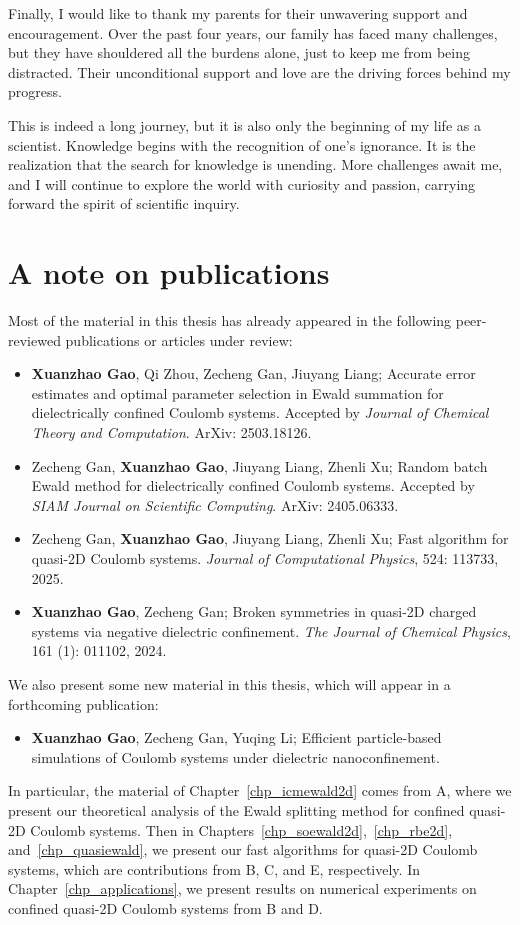 Finally, I would like to thank my parents for their unwavering support and encouragement.
Over the past four years, our family has faced many challenges, but they have shouldered all the burdens alone, just to keep me from being distracted.
Their unconditional support and love are the driving forces behind my progress.

This is indeed a long journey, but it is also only the beginning of my life as a scientist.
Knowledge begins with the recognition of one's ignorance. 
It is the realization that the search for knowledge is unending.
More challenges await me, and I will continue to explore the world with curiosity and passion, carrying forward the spirit of scientific inquiry.

\section*{A note on publications}

Most of the material in this thesis has already appeared in the following peer-reviewed publications or articles under review:
\begin{itemize}
    \item[A.] \textbf{Xuanzhao Gao}, Qi Zhou, Zecheng Gan, Jiuyang Liang; Accurate error estimates and optimal parameter selection in Ewald summation for dielectrically confined Coulomb systems. Accepted by \emph{Journal of Chemical Theory and Computation}. ArXiv: 2503.18126.
    \item[B.] Zecheng Gan, \textbf{Xuanzhao Gao}, Jiuyang Liang, Zhenli Xu; Random batch Ewald method for dielectrically confined Coulomb systems. Accepted by \emph{SIAM Journal on Scientific Computing}. ArXiv: 2405.06333.
    \item[C.] Zecheng Gan, \textbf{Xuanzhao Gao}, Jiuyang Liang, Zhenli Xu; Fast algorithm for quasi-2D Coulomb systems. \emph{Journal of Computational Physics}, 524: 113733, 2025.
    \item[D.] \textbf{Xuanzhao Gao}, Zecheng Gan; Broken symmetries in quasi-2D charged systems via negative dielectric confinement. \emph{The Journal of Chemical Physics}, 161 (1): 011102, 2024.
\end{itemize}
We also present some new material in this thesis, which will appear in a forthcoming publication:
\begin{itemize}
    \item[E.] \textbf{Xuanzhao Gao}, Zecheng Gan, Yuqing Li; Efficient particle-based simulations of Coulomb systems under dielectric nanoconfinement.
\end{itemize}
In particular, the material of Chapter~\ref{chp_icmewald2d} comes from A, where we present our theoretical analysis of the Ewald splitting method for confined quasi-2D Coulomb systems.
Then in Chapters~\ref{chp_soewald2d},~\ref{chp_rbe2d}, and~\ref{chp_quasiewald}, we present our fast algorithms for quasi-2D Coulomb systems, which are contributions from B, C, and E, respectively.
In Chapter~\ref{chp_applications}, we present results on numerical experiments on confined quasi-2D Coulomb systems from B and D.
